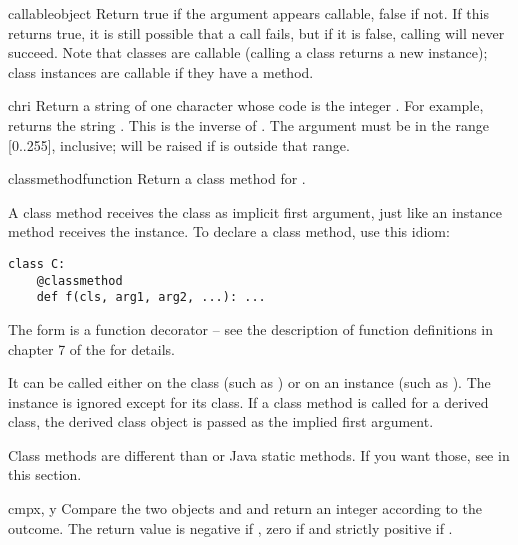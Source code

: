 \begin{funcdesc}{callable}{object}
  Return true if the  argument appears callable, false if
  not.  If this returns true, it is still possible that a call fails,
  but if it is false, calling  will never succeed.  Note
  that classes are callable (calling a class returns a new instance);
  class instances are callable if they have a 
  method.
\end{funcdesc}

\begin{funcdesc}{chr}{i}
  Return a string of one character whose \ASCII{} code is the integer
  .  For example,  returns the string .
  This is the inverse of .  The argument must be in
  the range [0..255], inclusive;  will be raised
  if  is outside that range.
\end{funcdesc}

\begin{funcdesc}{classmethod}{function}
  Return a class method for .

  A class method receives the class as implicit first argument,
  just like an instance method receives the instance.
  To declare a class method, use this idiom:

\begin{verbatim}
class C:
    @classmethod
    def f(cls, arg1, arg2, ...): ...
\end{verbatim}

  The  form is a function decorator -- see the description
  of function definitions in chapter 7 of the
   for details.

  It can be called either on the class (such as ) or on an
  instance (such as ).  The instance is ignored except for
  its class.
  If a class method is called for a derived class, the derived class
  object is passed as the implied first argument.

  Class methods are different than \Cpp{} or Java static methods.
  If you want those, see  in this section.
\end{funcdesc}

\begin{funcdesc}{cmp}{x, y}
  Compare the two objects  and  and return an integer
  according to the outcome.  The return value is negative if , zero if  and strictly positive if
  .
\end{funcdesc}

